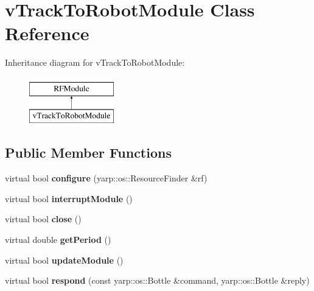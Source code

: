 \hypertarget{classvTrackToRobotModule}{}\section{v\+Track\+To\+Robot\+Module Class Reference}
\label{classvTrackToRobotModule}
Inheritance diagram for v\+Track\+To\+Robot\+Module\+:\begin{figure}[H]
\begin{center}
\leavevmode
\includegraphics[height=2.000000cm]{classvTrackToRobotModule}
\end{center}
\end{figure}
\subsection*{Public Member Functions}
\begin{DoxyCompactItemize}
\item 
virtual bool {\bfseries configure} (yarp\+::os\+::\+Resource\+Finder \&rf)\hypertarget{classvTrackToRobotModule_ac724b3b5b9a538f211b062d2adf0118d}{}\label{classvTrackToRobotModule_ac724b3b5b9a538f211b062d2adf0118d}

\item 
virtual bool {\bfseries interrupt\+Module} ()\hypertarget{classvTrackToRobotModule_a83db4c48a68b502cc18b8a2ddad56f31}{}\label{classvTrackToRobotModule_a83db4c48a68b502cc18b8a2ddad56f31}

\item 
virtual bool {\bfseries close} ()\hypertarget{classvTrackToRobotModule_af9d2b13bb4c006718d62a354f96a559a}{}\label{classvTrackToRobotModule_af9d2b13bb4c006718d62a354f96a559a}

\item 
virtual double {\bfseries get\+Period} ()\hypertarget{classvTrackToRobotModule_adcd051ae7fa4bec4cc8dd121c1f85931}{}\label{classvTrackToRobotModule_adcd051ae7fa4bec4cc8dd121c1f85931}

\item 
virtual bool {\bfseries update\+Module} ()\hypertarget{classvTrackToRobotModule_a6cb66f0717a055864f7ab4f8f0d8c132}{}\label{classvTrackToRobotModule_a6cb66f0717a055864f7ab4f8f0d8c132}

\item 
virtual bool {\bfseries respond} (const yarp\+::os\+::\+Bottle \&command, yarp\+::os\+::\+Bottle \&reply)\hypertarget{classvTrackToRobotModule_af14c10f5261e4a7790f35872f7e81361}{}\label{classvTrackToRobotModule_af14c10f5261e4a7790f35872f7e81361}

\end{DoxyCompactItemize}


